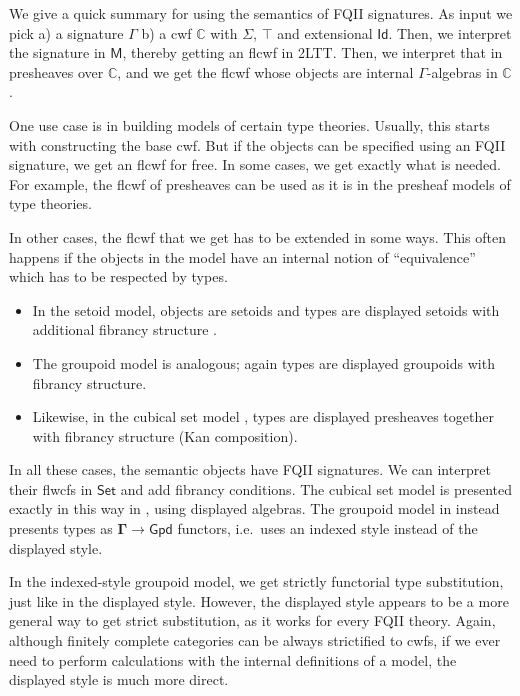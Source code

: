 \documentclass[12pt,a4paper,twoside,openany]{book}
\theoremstyle{remark}
\theoremstyle{definition}
\theoremstyle{theorem}
\newcommand{\ms}[1]{\mathsf{#1}}
\newcommand{\mbb}[1]{\mathbb{#1}}
\newcommand{\bs}[1]{\boldsymbol{#1}}
\newcommand{\Id}{\mathsf{Id}}
\newcommand{\Set}{\mathsf{Set}}
\newcommand{\bM}{\bs{\mathsf{M}}}
\newcommand{\mbbC}{\mbb{C}}
\begin{document}
We give a quick summary for using the semantics of FQII signatures. As input we
pick a) a signature $\Gamma$ b) a cwf $\mbbC$ with $\Sigma$, $\top$ and
extensional $\Id$. Then, we interpret the signature in $\bM$, thereby getting an
flcwf in 2LTT. Then, we interpret that in presheaves over $\mbbC$, and we get
the flcwf whose objects are internal $\Gamma$-algebras in $\mbbC$.

One use case is in building models of certain type theories. Usually, this
starts with constructing the base cwf. But if the objects can be specified using
an FQII signature, we get an flcwf for free. In some cases, we get exactly
what is needed. For example, the flcwf of presheaves can be used as it is in the
presheaf models of type theories.

In other cases, the flcwf that we get has to be extended in some
ways. This often happens if the objects in the model have an internal notion of
``equivalence'' which has to be respected by types.
\begin{itemize}
  \item In the setoid model, objects are setoids and types are displayed
    setoids with additional fibrancy structure \cite{setoidtt}.
  \item The groupoid model \cite{hofmann96groupoidmodel} is analogous; again types are displayed groupoids
    with fibrancy structure.
  \item Likewise, in the cubical set model \cite{cubical}, types are displayed
    presheaves together with fibrancy structure (Kan composition).
\end{itemize}

In all these cases, the semantic objects have FQII signatures. We can interpret
their flwcfs in $\bs{\Set}$ and add fibrancy conditions. The cubical set model
is presented exactly in this way in \cite{cubical}, using displayed
algebras. The groupoid model in \cite{hofmann96groupoidmodel} instead presents
types as $\bs{\Gamma} \to \bs{\ms{Gpd}}$ functors, i.e.\ uses an indexed style
instead of the displayed style.

In the indexed-style groupoid model, we get strictly functorial type
substitution, just like in the displayed style. However, the displayed style
appears to be a more general way to get strict substitution, as it works for
every FQII theory. Again, although finitely complete categories can be always
strictified to cwfs, if we ever need to perform calculations with the
internal definitions of a model, the displayed style is much more direct.
\end{document}
